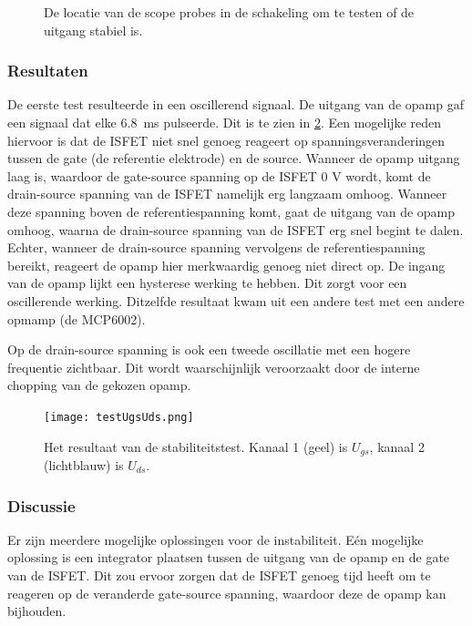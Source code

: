 \begin{figure}[ht]
    \centering
    \def\svgwidth{0.75\textwidth}
    
    \caption{De locatie van de scope probes in de schakeling om te testen of de uitgang stabiel is.}
    \label{fig:test ISFET circuit best}
\end{figure}


\subsubsection{Resultaten} \label{sec:stabilityTestResults}

De eerste test resulteerde in een oscillerend signaal. De uitgang van de opamp gaf een signaal dat elke \qty{6.8}{\milli\second} pulseerde. Dit is te zien in \cref{fig:resultUgsUds}.
Een mogelijke reden hiervoor is dat de ISFET niet snel genoeg reageert op spanningsveranderingen tussen de gate (de referentie elektrode) en de source. Wanneer de opamp uitgang laag is, waardoor de gate-source spanning op de ISFET 0 V wordt, komt de drain-source spanning van de ISFET namelijk erg langzaam omhoog. Wanneer deze spanning boven de referentiespanning komt, gaat de uitgang van de opamp omhoog, waarna de drain-source spanning van de ISFET erg snel begint te dalen. Echter, wanneer de drain-source spanning vervolgens de referentiespanning bereikt, reageert de opamp hier merkwaardig genoeg niet direct op. De ingang van de opamp lijkt een hysterese werking te hebben. Dit zorgt voor een oscillerende werking. Ditzelfde resultaat kwam uit een andere test met een andere opmamp (de MCP6002).

Op de drain-source spanning is ook een tweede oscillatie met een hogere frequentie zichtbaar. Dit wordt waarschijnlijk veroorzaakt door de interne chopping van de gekozen opamp.


\begin{figure}[ht]
    \centering
    \def\svgwidth{0.75\textwidth}
    \texttt{[image: testUgsUds.png]}
    \caption{Het resultaat van de stabiliteitstest. Kanaal 1 (geel) is $U_{gs}$, kanaal 2 (lichtblauw) is $U_{ds}$.}
    \label{fig:resultUgsUds}
\end{figure}


\subsubsection{Discussie}
Er zijn meerdere mogelijke oplossingen voor de instabiliteit.
Eén mogelijke oplossing is een integrator plaatsen tussen de uitgang van de opamp en de gate van de ISFET. Dit zou ervoor zorgen dat de ISFET genoeg tijd heeft om te reageren op de veranderde gate-source spanning, waardoor deze de opamp kan bijhouden.

